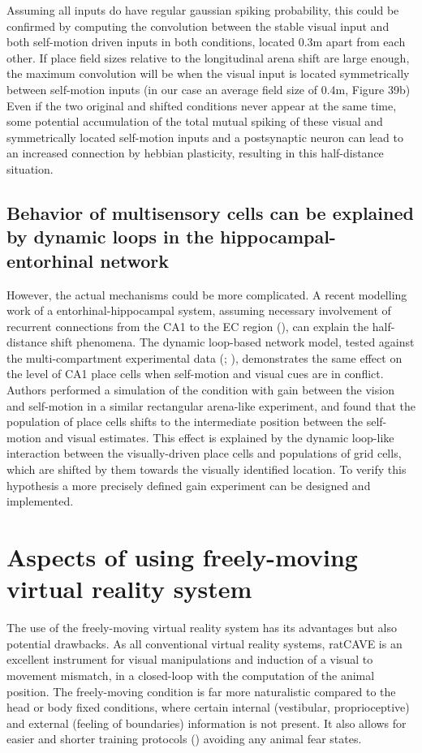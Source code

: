 Assuming all inputs do have regular gaussian spiking probability, this could be confirmed by computing the convolution between the stable visual input and both self-motion driven inputs in both conditions, located 0.3m apart from each other. If place field sizes relative to the longitudinal arena shift are large enough, the maximum convolution will be when the visual input is located symmetrically between self-motion inputs (in our case an average field size of 0.4m, Figure 39b) Even if the two original and shifted conditions never appear at the same time, some potential accumulation of the total mutual spiking of these visual and symmetrically located self-motion inputs and a postsynaptic neuron can lead to an increased connection by hebbian plasticity, resulting in this half-distance situation.


\subsection{Behavior of multisensory cells can be explained by dynamic loops in the hippocampal-entorhinal network}

However, the actual mechanisms could be more complicated. A recent modelling work of a entorhinal-hippocampal system, assuming necessary involvement of recurrent connections from the CA1 to the EC region (\cite{Li2020}), can explain the half-distance shift phenomena. The dynamic loop-based network model, tested against the multi-compartment experimental data (\cite{Carpenter2015}; \cite{Wernle2018}), demonstrates the same effect on the level of CA1 place cells when self-motion and visual cues are in conflict. Authors performed a simulation of the condition with gain between the vision and self-motion in a similar rectangular arena-like experiment, and found that the population of place cells shifts to the intermediate position between the self-motion and visual estimates. This effect is explained by the dynamic loop-like interaction between the visually-driven place cells and populations of grid cells, which are shifted by them towards the visually identified location. To verify this hypothesis a more precisely defined gain experiment can be designed and implemented.


\section{Aspects of using freely-moving virtual reality system}
\label{sec:aspects_of_vr}

The use of the freely-moving virtual reality system has its advantages but also potential drawbacks. As all conventional virtual reality systems, ratCAVE is an excellent instrument for visual manipulations and induction of a visual to movement mismatch, in a closed-loop with the computation of the animal position. The freely-moving condition is far more naturalistic compared to the head or body fixed conditions, where certain internal (vestibular, proprioceptive) and external (feeling of boundaries) information is not present. It also allows for easier and shorter training protocols (\cite{Ferreiro2020}) avoiding any animal fear states.

